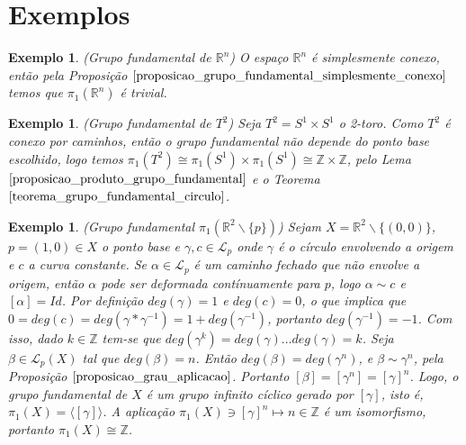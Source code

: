 \documentclass[12pt]{book}
\newtheorem{exemplo}[teorema]{Exemplo}
\newcommand{\caminhos}{\mathcal{L}}
\newcommand{\caminhospontobase}[1]{\caminhos_{#1}}
\newcommand{\caminhospontobasegeral}[2]{\caminhos_{#1}(#2)}
\newcommand{\circulo}{S^{1}}
\newcommand{\classe}[1]{[#1]}
\newcommand{\gerador}[1]{\langle #1\rangle}
\newcommand{\grupofundamental}[1]{\pi_{1}(#1)}
\newcommand{\inteiros}{\mathbb{Z}}
\newcommand{\real}[1]{\mathbb{R}^{#1}}
\begin{document}
	\section{Exemplos}
	\begin{exemplo}
		(Grupo fundamental de $\real{n}$) O espaço $\real{n}$ é simplesmente conexo, então pela Proposição $\ref{proposicao_grupo_fundamental_simplesmente_conexo}$ temos que $\grupofundamental{\real{n}}$ é trivial.
	\end{exemplo}
	\begin{exemplo}
		(Grupo fundamental de $T^{2}$) Seja $T^{2}=\circulo \times \circulo$ o 2-toro. Como $T^{2}$ é conexo por caminhos, então o grupo fundamental não depende do ponto base escolhido, logo temos $\grupofundamental{T^{2}} \cong \grupofundamental{\circulo} \times \grupofundamental{\circulo} \cong \inteiros \times \inteiros$, pelo Lema $\ref{proposicao_produto_grupo_fundamental}$ e o Teorema $\ref{teorema_grupo_fundamental_circulo}$. 
	\end{exemplo}
	
	\begin{exemplo}\label{exemplo_grupo_fundamental_plano_furo}
		(Grupo fundamental $\grupofundamental{\real{2}\backslash\{p\}}$) Sejam $X = \real{2}\backslash \{(0,0)\}$, $p=(1,0) \in X$ o ponto base e $\gamma,c \in \caminhospontobase{p}$ onde $\gamma$ é o círculo envolvendo a origem e $c$ a curva constante. Se $\alpha \in \caminhospontobase{p}$ é um caminho fechado que não envolve a origem, então $\alpha$ pode ser deformada contínuamente para $p$, logo $\alpha \sim c$ e $\classe{\alpha} = Id$. Por definição $deg(\gamma) = 1$ e $deg(c) =0$, o que implica que $0= deg(c)=deg(\gamma*\gamma^{-1}) = 1 +deg(\gamma^{-1})$, portanto $deg(\gamma^{-1})=-1$. Com isso, dado $k \in \inteiros$ tem-se que $deg(\gamma^{k}) = deg(\gamma)\dots deg(\gamma) = k$. Seja $\beta \in \caminhospontobasegeral{p}{X}$ tal que $deg(\beta)=n$. Então $deg(\beta) = deg(\gamma^{n})$, e $\beta \sim \gamma^{n}$, pela Proposição $\ref{proposicao_grau_aplicacao}$. Portanto $\classe{\beta} =  \classe{\gamma^{n}}=\classe{\gamma}^{n}$. Logo, o grupo fundamental de $X$ é um grupo infinito cíclico gerado por $\classe{\gamma}$, isto é, $\grupofundamental{X} = \gerador{\classe{\gamma}}$. A aplicação $\grupofundamental{X} \ni \classe{\gamma}^{n} \mapsto n \in \inteiros$ é um isomorfismo, portanto $\grupofundamental{X} \cong \inteiros$.
	\end{exemplo}
	
\end{document}

